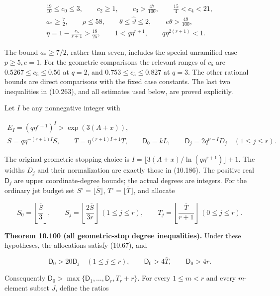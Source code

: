 \documentclass[
  11pt,
  a4paper,
]{article}
\begin{document}
\[
\begin{gathered}
\frac{19}{10}\le c_0\le3,\qquad c_2\ge1,\qquad
c_3>\frac{47}{100},\qquad \frac{15}{4}<c_4<21,\\
a_*\ge\frac72,\qquad \rho\le58,\qquad
\theta\le\widehat\vartheta\le2,\qquad e\theta>\frac{49}{100},\\
\eta=1-\frac{c_5}{r+1}>\frac{18}{25},\qquad
1<q\eta^{r+1},\qquad q\eta^{2(r+1)}<1 .
\end{gathered}
\tag{10.263}
\]

The bound \(a_*\ge7/2\), rather than seven, includes the special
unramified case \(p\ge5,e=1\). For the geometric comparisons the
relevant ranges of \(c_5\) are \(0.5267\le c_5\le0.56\) at \(q=2\), and
\(0.753\le c_5\le0.827\) at \(q=3\). The other rational bounds are
direct comparisons with the fixed case constants. The last two
inequalities in (10.263), and all estimates used below, are proved
explicitly.

Let \(I\) be any nonnegative integer with

\[
\begin{gathered}
E_I=(q\eta^{r+1})^I>\exp(3(A+x)),\\
\overline S=q\eta^{-(r+1)I}S,\qquad
\overline T=\eta^{(r+1)I+1}T,\qquad
\mathsf D_0=kL,\qquad
\mathsf D_j=2q^{\nu-I}D_j\quad(1\le j\le r).
\end{gathered}
\tag{10.264}
\]

The original geometric stopping choice is
\(I=\lfloor3(A+x)/\ln(q\eta^{r+1})\rfloor+1\). The widths \(D_j\) and
their normalization are exactly those in (10.186). The positive real
\(\mathsf D_j\) are upper coordinate-degree bounds; the actual degrees
are integers. For the ordinary jet budget set
\(S^\circ=\lfloor\overline S\rfloor\),
\(T^\circ=\lfloor\overline T\rfloor\), and allocate

\[
S_0=\left\lfloor\frac{\overline S}{3}\right\rfloor,\qquad
S_j=\left\lfloor\frac{2\overline S}{3r}\right\rfloor\ (1\le j\le r),
\qquad
T_j=\left\lfloor\frac{\overline T}{r+1}\right\rfloor\ (0\le j\le r).
\tag{10.265}
\]

\textbf{Theorem 10.100 (all geometric-stop degree inequalities).} Under
these hypotheses, the allocations satisfy (10.67), and

\[
\mathsf D_0>20\mathsf D_j\quad(1\le j\le r),\qquad
\mathsf D_0>4\overline T,\qquad
\mathsf D_0>4r.
\tag{10.266}
\]

Consequently
\(\mathsf D_0>\max\{\mathsf D_1,\ldots,\mathsf D_r,T_r+r\}\). For every
\(1\le m<r\) and every \(m\)-element subset \(J\), define the ratios
\end{document}

